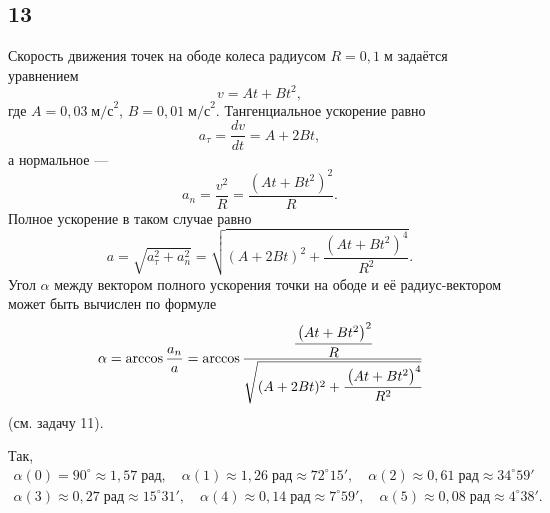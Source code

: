 \subsection{13}

Скорость движения точек на ободе колеса радиусом $R=0{,}1\;\text{м}$ задаётся уравнением
\[
v=At+Bt^2,
\]
где $A=0{,}03\;\text{м/с}^2$, $B=0{,}01\;\text{м/с}^2$. Тангенциальное ускорение равно
\[
a_\tau=\frac{dv}{dt}=A+2Bt,
\]
а нормальное ---
\[
a_n=\frac{v^2}{R}=\frac{\left(At+Bt^2\right)^2}{R}.
\]
Полное ускорение в таком случае равно
\[
a=\sqrt{a_\tau^2+a_n^2}=\sqrt{(A+2Bt)^2+\frac{\left(At+Bt^2\right)^4}{R^2}}. 
\]
Угол $\alpha$ между вектором полного ускорения точки на ободе и её радиус-вектором может быть вычислен по формуле
\[
\alpha=\arccos\frac{a_n}{a}=\arccos\cfrac{\cfrac{\left(At+Bt^2\right)^2}{R}}{\sqrt{(A+2Bt)^2+\cfrac{\left(At+Bt^2\right)^4}{R^2}}}
\]
(см. задачу 11).

Так,
\begin{gather*}
\alpha(0)=90^\circ\approx1{,}57\;\text{рад},\quad\alpha(1)\approx1{,}26\;\text{рад}\approx72^\circ15',\quad\alpha(2)\approx0{,}61\;\text{рад}\approx34^\circ59' \\
\alpha(3)\approx0{,}27\;\text{рад}\approx15^\circ31',\quad\alpha(4)\approx0{,}14\;\text{рад}\approx7^\circ59',\quad\alpha(5)\approx0{,}08\;\text{рад}\approx4^\circ38'.
\end{gather*}